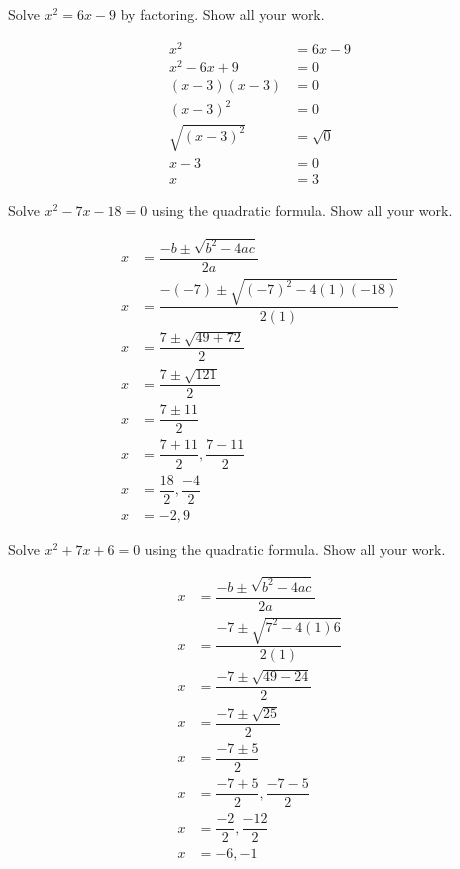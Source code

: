 \documentclass[11pt,letterpaper]{article}
\begin{document}
\newpage





 Solve $x^2= 6x - 9$ by factoring. Show all your work. \pspace

\sol
	\[
	\begin{aligned}
	x^2&= 6x - 9 \\[0.3cm]
	x^2 - 6x + 9&= 0 \\[0.3cm]
	(x - 3)(x - 3)&= 0 \\[0.3cm]
	(x - 3)^2&= 0 \\[0.3cm]
	\sqrt{(x - 3)^2}&= \sqrt{0} \\[0.3cm]
	x - 3&= 0 \\[0.3cm]
	x&= 3
	\end{aligned}
	\] 





\newpage





 Solve $x^2 - 7x - 18= 0$ using the quadratic formula. Show all your work. \pspace

\sol
	\[
	\begin{aligned}
	x&= \dfrac{-b \pm \sqrt{b^2 - 4ac}}{2a} \\[0.3cm]
	x&= \dfrac{-(-7) \pm \sqrt{(-7)^2 - 4(1)(-18)}}{2(1)} \\[0.3cm]
	x&= \dfrac{7 \pm \sqrt{49 + 72}}{2} \\[0.3cm]
	x&= \dfrac{7 \pm \sqrt{121}}{2} \\[0.3cm]
	x&= \dfrac{7 \pm 11}{2} \\[0.3cm]
	x&= \dfrac{7 + 11}{2}, \dfrac{7 - 11}{2} \\[0.3cm]
	x&= \dfrac{18}{2}, \dfrac{-4}{2} \\[0.3cm]
	x&= -2, 9
	\end{aligned}
	\] 





\newpage





 Solve $x^2 + 7x + 6= 0$ using the quadratic formula. Show all your work. \pspace

\sol
	\[
	\begin{aligned}
	x&= \dfrac{-b \pm \sqrt{b^2 - 4ac}}{2a} \\[0.3cm]
	x&=	\dfrac{-7 \pm \sqrt{7^2 - 4(1)6}}{2(1)} \\[0.3cm]
	x&= \dfrac{-7 \pm \sqrt{49 - 24}}{2} \\[0.3cm]
	x&= \dfrac{-7 \pm \sqrt{25}}{2} \\[0.3cm]
	x&= \dfrac{-7 \pm 5}{2} \\[0.3cm]
	x&= \dfrac{-7 + 5}{2}, \dfrac{-7 - 5}{2} \\[0.3cm]
	x&= \dfrac{-2}{2}, \dfrac{-12}{2} \\[0.3cm]
	x&= -6, -1
	\end{aligned}
	\] 
\end{document}
